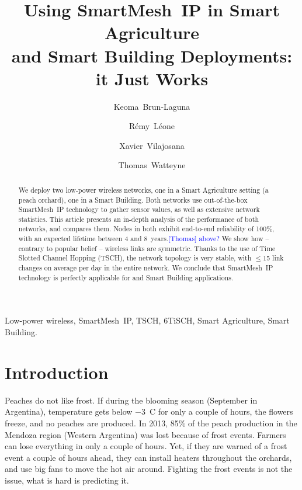 \documentclass{elsarticle}
\newcommand{\thomas}[1]      {\textcolor{blue}{[Thomas] #1}}
\newcommand{\smip}                {SmartMesh~IP\xspace}
\newcommand{\building}            {Smart Building\xspace}
\newcommand{\agri}                {Smart Agriculture\xspace}
\begin{document}
\begin{frontmatter}

\date{}

\title{Using \smip in \agri \\ and \building Deployments: it Just Works}

\author[inria]{Keoma~Brun-Laguna}
\author[inria]{R\'emy~L\'eone}
\author[uoc]{Xavier~Vilajosana}
\author[inria]{Thomas~Watteyne}

\address[inria]{~Inria, EVA team, Paris, France}
\address[uoc]{~Univ. Oberta de Catalunya, Barcelona, Catalonia, Spain}

\begin{abstract}
We deploy two low-power wireless networks, one in a \agri setting (a peach orchard), one in a \building.
Both networks use out-of-the-box \smip technology to gather sensor values, as well as extensive network statistics.
This article presents an in-depth analysis of the performance of both networks, and compares them.
Nodes in both exhibit end-to-end reliability of 100\%, with an expected lifetime between 4 and 8~years.\thomas{above?}
We show how -- contrary to popular belief -- wireless links are symmetric.
Thanks to the use of Time Slotted Channel Hopping (TSCH), the network topology is very stable, with $\leq$15 link changes on average per day in the entire network.
We conclude that \smip technology is perfectly applicable for  and \building applications.
\end{abstract}

\begin{keyword}
Low-power wireless, \smip, TSCH, 6TiSCH, \agri, \building.
\end{keyword}

\end{frontmatter}


\section{Introduction}
\label{sec:intro}


Peaches do not like frost.
If during the blooming season (September in Argentina), temperature gets below $-$3~C for only a couple of hours, the flowers freeze, and no peaches are produced.
In 2013, 85\% of the peach production in the Mendoza region (Western Argentina) was lost because of frost events.
Farmers can lose everything in only a couple of hours.
Yet, if they are warned of a frost event a couple of hours ahead, they can install heaters throughout the orchards, and use big fans to move the hot air around.
Fighting the frost events is not the issue, what is hard is predicting it.
\end{document}

